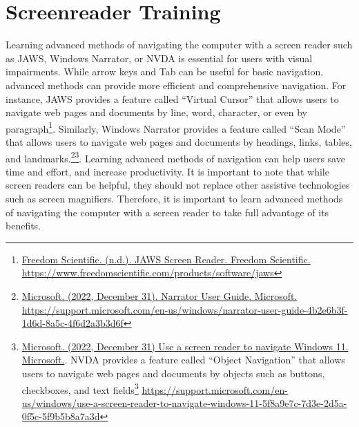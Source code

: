 \pagebreak\hypertarget{appx7}{}\section[Screenreader Training]{Screenreader Training}\label{appx7}
Learning advanced methods of navigating the computer with a screen reader such as JAWS, Windows Narrator, or NVDA is essential for users with visual impairments. While arrow keys and Tab can be useful for basic navigation, advanced methods can provide more efficient and comprehensive navigation. For instance, JAWS provides a feature called “Virtual Cursor” that allows users to navigate web pages and documents by line, word, character, or even by paragraph\footnote{\raggedright \href{https://www.freedomscientific.com/products/software/jaws}{Freedom Scientific. (n.d.). JAWS Screen Reader. Freedom Scientific.} \break\url{https://www.freedomscientific.com/products/software/jaws}}. Similarly, Windows Narrator provides a feature called “Scan Mode” that allows users to navigate web pages and documents by headings, links, tables, and landmarks.\footnote{\raggedright \href{https://support.microsoft.com/en-us/windows/narrator-user-guide-4b2e6b3f-1d6d-8a5c-4f6d2a3b3d6f}{Microsoft. (2022, December 31). Narrator User Guide. Microsoft. } \break\url{https://support.microsoft.com/en-us/windows/narrator-user-guide-4b2e6b3f-1d6d-8a5c-4f6d2a3b3d6f}}\fnsep\footnote{\raggedright \href{https://support.microsoft.com/en-us/windows/use-a-screen-reader-to-navigate-windows-11-5f8a9e7c-7d3e-2d5a-0f5c-5f9b5b8a7a3d}{Microsoft. (2022, December 31) Use a screen reader to navigate Windows 11. Microsoft.}. NVDA provides a feature called “Object Navigation” that allows users to navigate web pages and documents by objects such as buttons, checkboxes, and text fields\footnote{\raggedright \href{https://www.nvaccess.org/files/nvda/documentation/userGuide.html\#toc3.1}{NV Access. (2022, December 31). NVDA User Guide. NV Access. } \break\url{https://www.nvaccess.org/files/nvda/documentation/userGuide.html\#toc3.1}}  \break\url{https://support.microsoft.com/en-us/windows/use-a-screen-reader-to-navigate-windows-11-5f8a9e7c-7d3e-2d5a-0f5c-5f9b5b8a7a3d}}. Learning advanced methods of navigation can help users save time and effort, and increase productivity. It is important to note that while screen readers can be helpful, they should not replace other assistive technologies such as screen magnifiers. Therefore, it is important to learn advanced methods of navigating the computer with a screen reader to take full advantage of its benefits.
